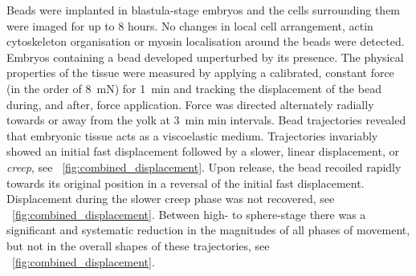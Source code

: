 
Beads were implanted in blastula-stage embryos and the cells surrounding them were imaged for up to 8 hours.
No changes in local cell arrangement, actin cytoskeleton organisation or myosin localisation around the beads were detected.
Embryos containing a bead developed unperturbed by its presence.
The physical properties of the tissue were measured by applying a calibrated, constant force (in the order of \SI{8}{\milli\newton}) for \SI{1}{\minute} and tracking the displacement of the bead during, and after, force application.
Force was directed alternately radially towards or away from the yolk at \SI{3}{\minute} min intervals.
Bead trajectories revealed that embryonic tissue acts as a viscoelastic medium.
Trajectories invariably showed an initial fast displacement followed by a slower, linear displacement, or \emph{creep}, see \figurename~\ref{fig:combined_displacement}.
Upon release, the bead recoiled rapidly towards its original position in a reversal of the initial fast displacement.
Displacement during the slower creep phase was not recovered, see \figurename~\ref{fig:combined_displacement}.
Between high- to sphere-stage there was a significant and systematic reduction in the magnitudes of all phases of movement, but not in the overall shapes of these trajectories, see \figurename~\ref{fig:combined_displacement}.

